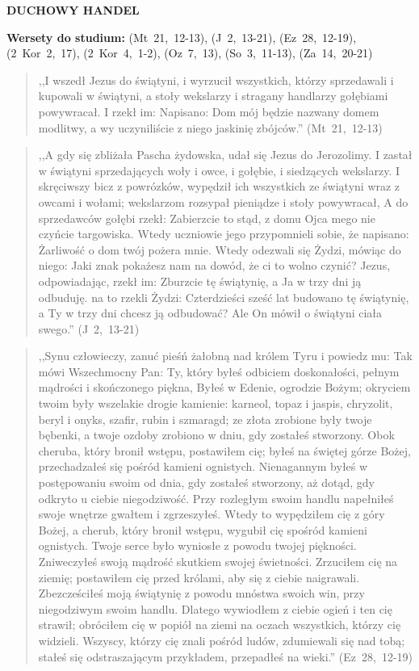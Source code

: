 \documentclass[10pt,a4paper,oneside]{article}
\begin{document}
\centerline{\textbf{\MakeUppercase{Duchowy handel}}}
\begin{center}
\textbf{Wersety do studium:} (Mt~21,~12-13), (J~2,~13-21), (Ez~28,~12-19), (2~Kor~2,~17), (2~Kor~4,~1-2), (Oz~7,~13), (So~3,~11-13), (Za~14,~20-21)
\end{center}
\begin{quote}
,,I wszedł Jezus do świątyni, i wyrzucił wszystkich, którzy sprzedawali i kupowali w świątyni, a stoły wekslarzy i stragany handlarzy gołębiami powywracał. I rzekł im: Napisano: Dom mój będzie nazwany domem modlitwy, a wy uczyniliście z niego jaskinię zbójców.'' (Mt~21,~12-13)
\end{quote}
\begin{quote}
,,A gdy się zbliżała Pascha żydowska, udał się Jezus do Jerozolimy. I zastał w świątyni sprzedających woły i owce, i gołębie, i siedzących wekslarzy. I skręciwszy bicz z powrózków, wypędził ich wszystkich ze świątyni wraz z owcami i wołami; wekslarzom rozsypał pieniądze i stoły powywracał, A do sprzedawców gołębi rzekł: Zabierzcie to stąd, z domu Ojca mego nie czyńcie targowiska. Wtedy uczniowie jego przypomnieli sobie, że napisano: Żarliwość o dom twój pożera mnie. Wtedy odezwali się Żydzi, mówiąc do niego: Jaki znak pokażesz nam na dowód, że ci to wolno czynić? Jezus, odpowiadając, rzekł im: Zburzcie tę świątynię, a Ja w trzy dni ją odbuduję. na to rzekli Żydzi: Czterdzieści sześć lat budowano tę świątynię, a Ty w trzy dni chcesz ją odbudować? Ale On mówił o świątyni ciała swego.'' (J~2,~13-21)
\end{quote}
\begin{quote}
,,Synu człowieczy, zanuć pieśń żałobną nad królem Tyru i powiedz mu: Tak mówi Wszechmocny Pan: Ty, który byłeś odbiciem doskonałości, pełnym mądrości i skończonego piękna, Byłeś w Edenie, ogrodzie Bożym; okryciem twoim były wszelakie drogie kamienie: karneol, topaz i jaspis, chryzolit, beryl i onyks, szafir, rubin i szmaragd; ze złota zrobione były twoje bębenki, a twoje ozdoby zrobiono w dniu, gdy zostałeś stworzony. Obok cheruba, który bronił wstępu, postawiłem cię; byłeś na świętej górze Bożej, przechadzałeś się pośród kamieni ognistych. Nienagannym byłeś w postępowaniu swoim od dnia, gdy zostałeś stworzony, aż dotąd, gdy odkryto u ciebie niegodziwość. Przy rozległym swoim handlu napełniłeś swoje wnętrze gwałtem i zgrzeszyłeś. Wtedy to wypędziłem cię z góry Bożej, a cherub, który bronił wstępu, wygubił cię spośród kamieni ognistych. Twoje serce było wyniosłe z powodu twojej piękności. Zniweczyłeś swoją mądrość skutkiem swojej świetności. Zrzuciłem cię na ziemię; postawiłem cię przed królami, aby się z ciebie naigrawali. Zbezcześciłeś moją świątynię z powodu mnóstwa swoich win, przy niegodziwym swoim handlu. Dlatego wywiodłem z ciebie ogień i ten cię strawił; obróciłem cię w popiół na ziemi na oczach wszystkich, którzy cię widzieli. Wszyscy, którzy cię znali pośród ludów, zdumiewali się nad tobą; stałeś się odstraszającym przykładem, przepadłeś na wieki.'' (Ez~28,~12-19)
\end{quote}
\end{document}

